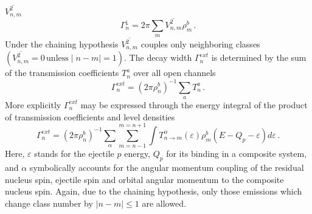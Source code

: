 $\overline{V_{n,m}^{2}}$ 
\begin{equation}
\Gamma_{n}^{\downarrow}=2\pi\sum_{m}\overline{V_{n,m}^{2}}\rho_{m}^{b}\,.
\label{GdownMSC}
\end{equation}
Under the chaining hypothesis $\overline{V_{n,m}^{2}}$ couples only
neighboring classes $(\overline{V_{n,m}^{2}}=0\,{\text{unless}}\mid
n-m\mid=1)$. The decay width $\Gamma_{n}^{ext}$ is determined by the sum of
the transmission coefficients $T_{n}^{a}$ over all open channels 
\begin{equation}
\Gamma_{n}^{ext}=(2\pi\rho_{n}^{b})^{-1}\sum_{a}T_{n}^{a}\,.
\end{equation}
More explicitly $\Gamma_{n}^{ext}$ may be expressed through the energy
integral of the product of transmission coefficients and level densities%
\begin{equation}
\Gamma_{n}^{ext}=(2\pi\rho_{n}^{b})^{-1}\sum_{\alpha}\sum_{m=n-1}^{m=n+1}%
\int T_{n\rightarrow
m}^{\alpha}(\varepsilon)\rho_{m}^{b}(E-Q_{p}-\varepsilon)d\varepsilon\,.
\label{Gammext}
\end{equation}
Here, $\varepsilon$ stands for the ejectile $p$ energy, $Q_{p}$ for its
binding in a composite system, and $\alpha$ symbolically accounts for the
angular momentum coupling of the residual nucleus spin, ejectile spin and
orbital angular momentum to the composite nucleus spin. Again, due to the
chaining hypothesis, only those emissions which change class number by $\mid
n-m\mid\leq1$ are allowed.

